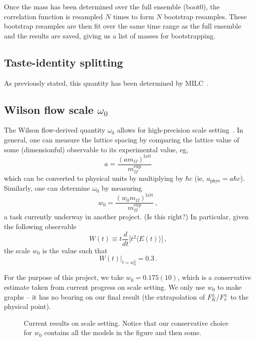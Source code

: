 \documentclass[prd,tightenlines,preprintnumbers,showpacs,superscriptaddress,notitlepage,eqsecnum,floatfix,notitlepage]{revtex4-1}
\newcommand{\includegraphicsifexists}[2][]{\IfFileExists{#2}{\texttt{[image: \#2]}}{\texttt{[image: \#2]}}}
\begin{document}
Once the mass has been determined over the full ensemble (boot0), the correlation function is resampled $N$ times to form $N$ bootstrap resamples. These bootstrap resamples are then fit over the same time range as the full ensemble and the results are saved, giving us a list of masses for bootstrapping.

\subsection{Taste-identity splitting}
As previously stated, this quantity has been determined by MILC~\cite{Bazavov:2012xda}.

\subsection{Wilson flow scale $\omega_0$}
The Wilson flow-derived quantity $\omega_0$ allows for high-precision scale setting~\cite{Borsanyi:2012zs}. In general, one can measure the lattice spacing by comparing the lattice value of some (dimensionful) observable to its experimental value, eg,
\begin{equation}
a = \frac{(a m_\Omega)^\text{latt}}{m_\Omega^\text{exp}}
\end{equation}
which can be converted to physical units by multiplying by $\hbar c$ (ie, $a_\text{phys} = a \hbar c$). Similarly, one can determine $\omega_0$ by measuring
\begin{equation}
w_0 = \frac{(w_0 m_\Omega)^\text{latt}}{m_\Omega^\text{exp}} \, ,
\end{equation}
a task currently underway in another project.  {\color{red} (Is this right?)} In particular, given the following observable
\begin{equation}
W(t) \equiv t \frac{d}{dt} \Big[ t^2 \langle E(t) \rangle \Big] \, ,
\end{equation}
the scale $w_0$ is the value such that
\begin{equation}
W(t) \Big|_{t=w_0^2} = 0.3 \, .
\end{equation}

For the purpose of this project, we take $w_0 = 0.175(10)$, which is a conservative estimate taken from current progress on scale setting. We only use $w_0$ to make graphs -- it has no bearing on our final result (the extrapolation of $F^\pm_K/F^\pm_\pi$ to the physical point).

\begin{figure}
	\includegraphicsifexists[width=0.75\textwidth]{./../figs/w0_comparison.pdf}
	\caption{Current results on scale setting. Notice that our conservative choice for $w_0$ contains all the models in the figure and then some.}
\end{figure}
\end{document}
